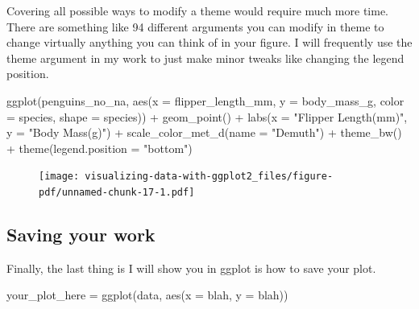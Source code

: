 \documentclass[
  letterpaper,
  DIV=11,
  numbers=noendperiod,
  oneside]{scrreprt}
\newenvironment{Shaded}{\begin{snugshade}}{\end{snugshade}}
\newcommand{\AttributeTok}[1]{\textcolor[rgb]{0.40,0.45,0.13}{#1}}
\newcommand{\FunctionTok}[1]{\textcolor[rgb]{0.28,0.35,0.67}{#1}}
\newcommand{\NormalTok}[1]{\textcolor[rgb]{0.00,0.23,0.31}{#1}}
\newcommand{\OtherTok}[1]{\textcolor[rgb]{0.00,0.23,0.31}{#1}}
\newcommand{\SpecialCharTok}[1]{\textcolor[rgb]{0.37,0.37,0.37}{#1}}
\newcommand{\StringTok}[1]{\textcolor[rgb]{0.13,0.47,0.30}{#1}}
\begin{document}
Covering all possible ways to modify a theme would require much more
time. There are something like 94 different arguments you can modify in
theme to change virtually anything you can think of in your figure. I
will frequently use the theme argument in my work to just make minor
tweaks like changing the legend position.

\begin{Shaded}
\begin{Highlighting}[]
 \FunctionTok{ggplot}\NormalTok{(penguins\_no\_na,}
       \FunctionTok{aes}\NormalTok{(}\AttributeTok{x =}\NormalTok{ flipper\_length\_mm,}
           \AttributeTok{y =}\NormalTok{ body\_mass\_g,}
           \AttributeTok{color =}\NormalTok{ species,}
           \AttributeTok{shape =}\NormalTok{ species)) }\SpecialCharTok{+}
\FunctionTok{geom\_point}\NormalTok{() }\SpecialCharTok{+}
\FunctionTok{labs}\NormalTok{(}\AttributeTok{x =} \StringTok{"Flipper Length(mm)"}\NormalTok{, }\AttributeTok{y =} \StringTok{"Body Mass(g)"}\NormalTok{) }\SpecialCharTok{+}
\FunctionTok{scale\_color\_met\_d}\NormalTok{(}\AttributeTok{name =} \StringTok{"Demuth"}\NormalTok{) }\SpecialCharTok{+}
\FunctionTok{theme\_bw}\NormalTok{() }\SpecialCharTok{+} 
\FunctionTok{theme}\NormalTok{(}\AttributeTok{legend.position =} \StringTok{"bottom"}\NormalTok{)}
\end{Highlighting}
\end{Shaded}

\begin{figure}[H]

{\centering \texttt{[image: visualizing-data-with-ggplot2\_files/figure-pdf/unnamed-chunk-17-1.pdf]}

}

\end{figure}

\hypertarget{saving-your-work}{%
\subsection{Saving your work}\label{saving-your-work}}

Finally, the last thing is I will show you in ggplot is how to save your
plot.

\begin{Shaded}
\begin{Highlighting}[]
\NormalTok{your\_plot\_here }\OtherTok{=} \FunctionTok{ggplot}\NormalTok{(data, }\FunctionTok{aes}\NormalTok{(}\AttributeTok{x =}\NormalTok{ blah, }\AttributeTok{y =}\NormalTok{ blah))}
\end{Highlighting}
\end{Shaded}
\end{document}
